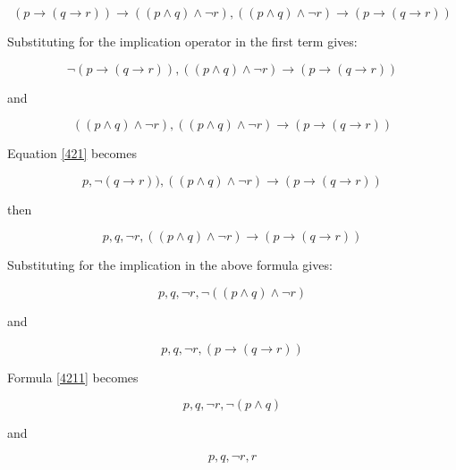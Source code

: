 \documentclass[10pt,a4paper]{article}
\begin{document}
\begin{equation}
 (p \rightarrow ( q \rightarrow r )) \rightarrow (( p \wedge q) \wedge \neg r), (( p \wedge q) \wedge \neg r) \rightarrow (p \rightarrow ( q \rightarrow r )) 
\end{equation}

Substituting for the implication operator in the first term gives:

\begin{equation}
\label{421}
 \neg(p \rightarrow ( q \rightarrow r )),  (( p \wedge q) \wedge \neg r) \rightarrow (p \rightarrow ( q \rightarrow r )) 
\end{equation}

and

\begin{equation}
\label{422}
 ((p \wedge q) \wedge \neg r ),  (( p \wedge q) \wedge \neg r) \rightarrow (p \rightarrow ( q \rightarrow r )) 
\end{equation}

Equation \ref{421} becomes

\begin{equation}
p, \neg ( q \rightarrow r )),  (( p \wedge q) \wedge \neg r) \rightarrow (p \rightarrow ( q \rightarrow r )) 
\end{equation}

then 

\begin{equation}
\label{421a}
p, q, \neg r, (( p \wedge q) \wedge \neg r) \rightarrow (p \rightarrow ( q \rightarrow r )) 
\end{equation}

Substituting for the implication in the above formula gives:

\begin{equation}
\label{4211}
p, q, \neg r, \neg (( p \wedge q) \wedge \neg r)
\end{equation}

and

\begin{equation}
\label{4212}
p, q, \neg r, (p \rightarrow ( q \rightarrow r )) 
\end{equation}


Formula \ref{4211} becomes 


\begin{equation}
\label{42111}
p, q, \neg r, \neg ( p \wedge q)
\end{equation}

and 

\begin{equation}
\label{42112}
p, q, \neg r, r
\end{equation}
\end{document}
